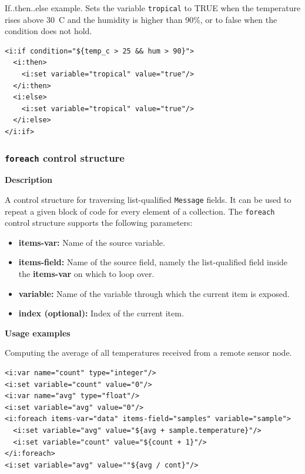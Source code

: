 If..then..else example. Sets the variable \texttt{tropical} to TRUE when the
temperature rises above 30\degree~C and the humidity is higher than 90\%, or
to false when the condition does not hold.

\lstset{language=XML}
\begin{lstlisting}
<i:if condition="${temp_c > 25 && hum > 90}"> 
  <i:then>
    <i:set variable="tropical" value="true"/>
  </i:then>
  <i:else>
    <i:set variable="tropical" value="true"/>
  </i:else>
</i:if>
\end{lstlisting}


\subsubsection{\texttt{foreach} control structure}

\textbf{Description}

A control structure for traversing list-qualified \texttt{Message} fields. It
can be used to repeat a given block of code for every element of a collection.
The \texttt{foreach} control structure supports the following parameters:

\begin{itemize}

    \item \textbf{items-var:} Name of the source variable.

    \item \textbf{items-field:} Name of the source field, namely the
        list-qualified field inside the \textbf{items-var} on which to loop
        over.

    \item \textbf{variable:} Name of the variable through which the current
        item is exposed.

    \item \textbf{index (optional):} Index of the current item.

\end{itemize}

\textbf{Usage examples}

Computing the average of all temperatures received from a remote sensor node.

\lstset{language=XML}
\begin{lstlisting}
<i:var name="count" type="integer"/>
<i:set variable="count" value="0"/> 
<i:var name="avg" type="float"/>
<i:set variable="avg" value="0"/>
<i:foreach items-var="data" items-field="samples" variable="sample">
  <i:set variable="avg" value="${avg + sample.temperature}"/>
  <i:set variable="count" value="${count + 1}"/>
</i:foreach>
<i:set variable="avg" value=""${avg / cont}"/>
\end{lstlisting}

